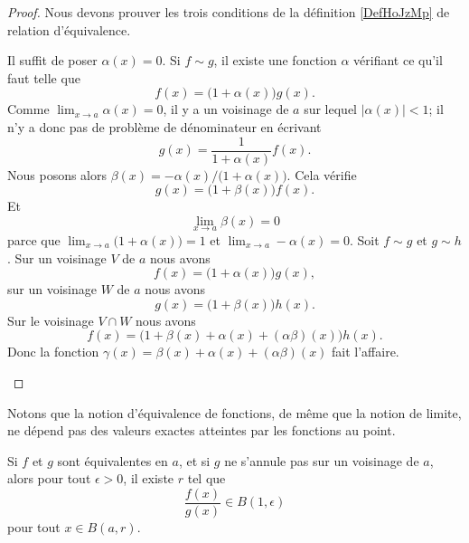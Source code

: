 \begin{proof}
	Nous devons prouver les trois conditions de la définition \ref{DefHoJzMp} de relation d'équivalence.
	\begin{subproof}
		\spitem[Réflexive]
		Il suffit de poser \( \alpha(x)=0\).
		\spitem[Symétrique]
		Si \( f\sim g\), il existe une fonction \( \alpha\) vérifiant ce qu'il faut telle que
		\begin{equation}
			f(x)=\big( 1+\alpha(x) \big)g(x).
		\end{equation}
		Comme \( \lim_{x\to a} \alpha(x)=0\), il y a un voisinage de \( a\) sur lequel \( | \alpha(x) |<1\); il n'y a donc pas de problème de dénominateur en écrivant
		\begin{equation}
			g(x)=\frac{1}{ 1+\alpha(x) }f(x).
		\end{equation}
		Nous posons alors \( \beta(x)=-\alpha(x)/\big( 1+\alpha(x) \big)\). Cela vérifie
		\begin{equation}
			g(x)=\big( 1+\beta(x) \big)f(x).
		\end{equation}
		Et
		\begin{equation}
			\lim_{x\to a} \beta(x)=0
		\end{equation}
		parce que \( \lim_{x\to a} \big( 1 + \alpha(x)\big)=1\) et \( \lim_{x\to a} -\alpha(x)=0\).
		\spitem[Transitive]
		Soit \( f\sim g\) et \( g\sim h\). Sur un voisinage \( V\) de \( a\) nous avons
		\begin{equation}
			f(x)=\big( 1+\alpha(x) \big)g(x),
		\end{equation}
		sur un voisinage \( W\) de \( a\) nous avons
		\begin{equation}
			g(x)=\big( 1+\beta(x) \big)h(x).
		\end{equation}
		Sur le voisinage \( V\cap W\) nous avons
		\begin{equation}
			f(x)=\big( 1+\beta(x)+\alpha(x)+(\alpha\beta)(x) \big)h(x).
		\end{equation}
		Donc la fonction \( \gamma(x)=\beta(x)+\alpha(x)+(\alpha\beta)(x)\) fait l'affaire.
	\end{subproof}
\end{proof}

Notons que la notion d'équivalence de fonctions, de même que la notion de limite, ne dépend pas des valeurs exactes atteintes par les fonctions au point.

\begin{lemma}
	Si \( f\) et \( g\) sont équivalentes en \( a\), et si \( g\) ne s'annule pas sur un voisinage de \( a\), alors pour tout \( \epsilon>0\), il existe \( r\) tel que
	\begin{equation}
		\frac{ f(x) }{ g(x) }\in B(1,\epsilon)
	\end{equation}
	pour tout \( x\in B(a,r)\).
\end{lemma}

